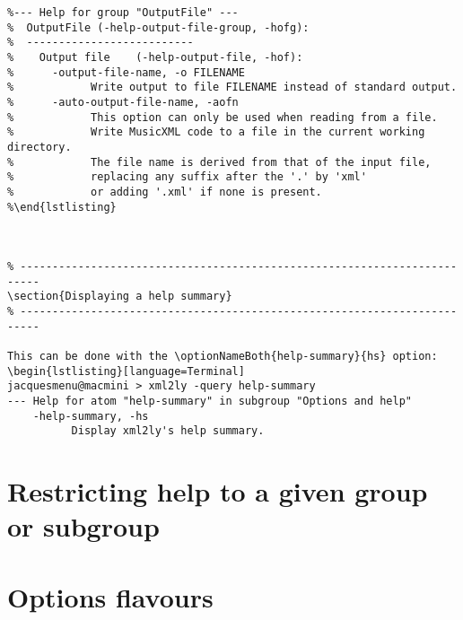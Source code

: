 %
\begin{lstlisting}[language=Terminal]
%jacquesmenu@macmini: ~ > xml2ly -help-output-file-group -insider
%--- Help for group "OutputFile" ---
%  OutputFile (-help-output-file-group, -hofg):
%  --------------------------
%    Output file    (-help-output-file, -hof):
%      -output-file-name, -o FILENAME
%            Write output to file FILENAME instead of standard output.
%      -auto-output-file-name, -aofn
%            This option can only be used when reading from a file.
%            Write MusicXML code to a file in the current working directory.
%            The file name is derived from that of the input file,
%            replacing any suffix after the '.' by 'xml'
%            or adding '.xml' if none is present.
%\end{lstlisting}



\section{Displaying a help summary}

This can be done with the \optionNameBoth{help-summary}{hs} option:
\begin{lstlisting}[language=Terminal]
jacquesmenu@macmini > xml2ly -query help-summary
--- Help for atom "help-summary" in subgroup "Options and help"
    -help-summary, -hs
          Display xml2ly's help summary.
\end{lstlisting}

\section{Restricting help to a given group or subgroup}


\section{Options flavours}

